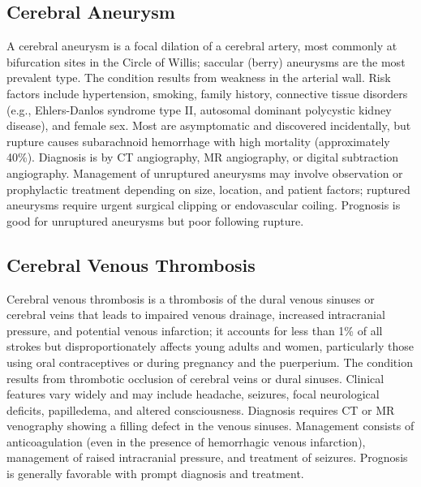 






\label{sec:Cerebrovascular Diseases}

\subsection{Cerebral Aneurysm}
\label{sec:Cerebral Aneurysm}
A cerebral aneurysm is a focal dilation of a cerebral artery, most commonly at bifurcation sites in the Circle of Willis; saccular (berry) aneurysms are the most prevalent type. The condition results from weakness in the arterial wall. Risk factors include hypertension, smoking, family history, connective tissue disorders (e.g., Ehlers-Danlos syndrome type II, autosomal dominant polycystic kidney disease), and female sex. Most are asymptomatic and discovered incidentally, but rupture causes subarachnoid hemorrhage with high mortality (approximately 40\%). Diagnosis is by CT angiography, MR angiography, or digital subtraction angiography. Management of unruptured aneurysms may involve observation or prophylactic treatment depending on size, location, and patient factors; ruptured aneurysms require urgent surgical clipping or endovascular coiling. Prognosis is good for unruptured aneurysms but poor following rupture.

\subsection{Cerebral Venous Thrombosis}
\label{sec:Cerebral Venous Thrombosis}
Cerebral venous thrombosis is a thrombosis of the dural venous sinuses or cerebral veins that leads to impaired venous drainage, increased intracranial pressure, and potential venous infarction; it accounts for less than 1\% of all strokes but disproportionately affects young adults and women, particularly those using oral contraceptives or during pregnancy and the puerperium. The condition results from thrombotic occlusion of cerebral veins or dural sinuses. Clinical features vary widely and may include headache, seizures, focal neurological deficits, papilledema, and altered consciousness. Diagnosis requires CT or MR venography showing a filling defect in the venous sinuses. Management consists of anticoagulation (even in the presence of hemorrhagic venous infarction), management of raised intracranial pressure, and treatment of seizures. Prognosis is generally favorable with prompt diagnosis and treatment.

